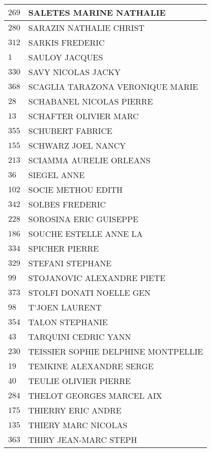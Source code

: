 \begin{xltabular}{\linewidth}{|l|X|}
    \hline
    $269$ & SALETES MARINE NATHALIE \\
    \hline
    $280$ & SARAZIN NATHALIE CHRIST \\
    \hline
    $312$ & SARKIS FREDERIC \\
    \hline
    $1$ & SAULOY JACQUES \\
    \hline
    $330$ & SAVY NICOLAS JACKY \\
    \hline
    $368$ & SCAGLIA TARAZONA VERONIQUE MARIE \\
    \hline
    $28$ & SCHABANEL NICOLAS PIERRE \\
    \hline
    $13$ & SCHAFTER OLIVIER MARC \\
    \hline
    $355$ & SCHUBERT FABRICE \\
    \hline
    $155$ & SCHWARZ JOEL NANCY \\
    \hline
    $213$ & SCIAMMA AURELIE ORLEANS \\
    \hline
    $36$ & SIEGEL ANNE \\
    \hline
    $102$ & SOCIE METHOU EDITH \\
    \hline
    $342$ & SOLBES FREDERIC \\
    \hline
    $228$ & SOROSINA ERIC GUISEPPE \\
    \hline
    $186$ & SOUCHE ESTELLE ANNE LA \\
    \hline
    $334$ & SPICHER PIERRE \\
    \hline
    $329$ & STEFANI STEPHANE \\
    \hline
    $99$ & STOJANOVIC ALEXANDRE PIETE \\
    \hline
    $373$ & STOLFI DONATI NOELLE GEN \\
    \hline
    $98$ & T'JOEN LAURENT \\
    \hline
    $354$ & TALON STEPHANIE \\
    \hline
    $43$ & TARQUINI CEDRIC YANN \\
    \hline
    $230$ & TEISSIER SOPHIE DELPHINE MONTPELLIE \\
    \hline
    $19$ & TEMKINE ALEXANDRE SERGE \\
    \hline
    $40$ & TEULIE OLIVIER PIERRE \\
    \hline
    $284$ & THELOT GEORGES MARCEL AIX \\
    \hline
    $175$ & THIERRY ERIC ANDRE \\
    \hline
    $135$ & THIERY MARC NICOLAS \\
    \hline
    $363$ & THIRY JEAN-MARC STEPH \\

\end{xltabular}
